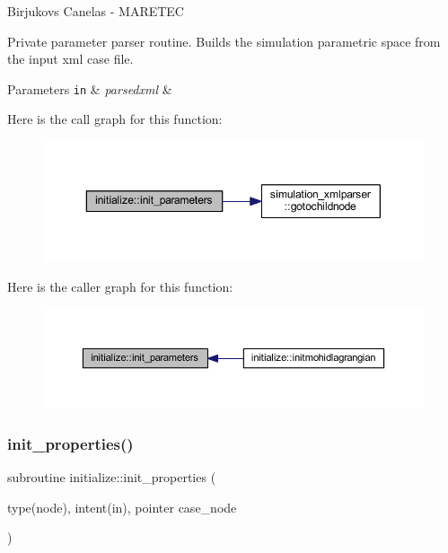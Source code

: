 Birjukovs Canelas -\/ M\+A\+R\+E\+T\+EC 

Private parameter parser routine. Builds the simulation parametric space from the input xml case file. 
\begin{DoxyParams}[1]{Parameters}
\mbox{\tt in}  & {\em parsedxml} & \\
\hline
\end{DoxyParams}
Here is the call graph for this function\+:
\nopagebreak
\begin{figure}[H]
\begin{center}
\leavevmode
\includegraphics[width=350pt]{namespaceinitialize_a7a54dc126f448bea2b566339a449f85c_cgraph}
\end{center}
\end{figure}
Here is the caller graph for this function\+:
\nopagebreak
\begin{figure}[H]
\begin{center}
\leavevmode
\includegraphics[width=350pt]{namespaceinitialize_a7a54dc126f448bea2b566339a449f85c_icgraph}
\end{center}
\end{figure}
\mbox{\label{namespaceinitialize_a4640ad15e29b88467ec842f274f64b62}} 
\subsubsection{\texorpdfstring{init\+\_\+properties()}{init\_properties()}}
{\footnotesize\ttfamily subroutine initialize\+::init\+\_\+properties (\begin{DoxyParamCaption}\item[{type(node), intent(in), pointer}]{case\+\_\+node }\end{DoxyParamCaption})\hspace{0.3cm}{\ttfamily [private]}}



